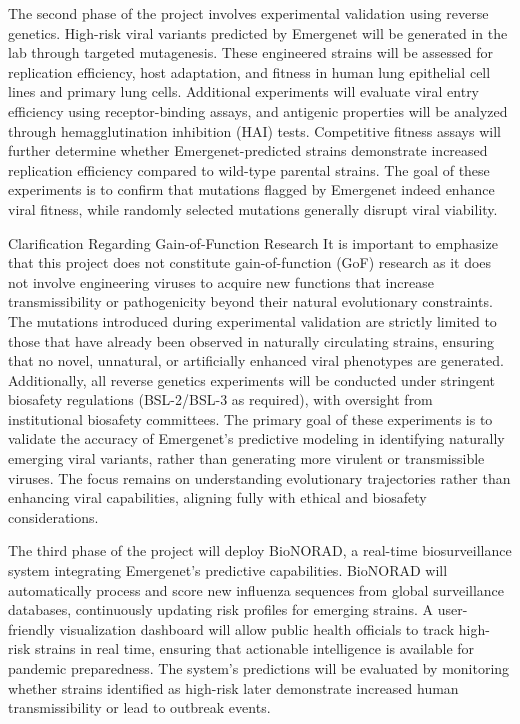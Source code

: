 \documentclass[onecolumn, compsoc,10pt]{IEEEtran}
\begin{document}
The second phase of the project involves experimental validation using reverse genetics. High-risk viral variants predicted by Emergenet will be generated in the lab through targeted mutagenesis. These engineered strains will be assessed for replication efficiency, host adaptation, and fitness in human lung epithelial cell lines and primary lung cells. Additional experiments will evaluate viral entry efficiency using receptor-binding assays, and antigenic properties will be analyzed through hemagglutination inhibition (HAI) tests. Competitive fitness assays will further determine whether Emergenet-predicted strains demonstrate increased replication efficiency compared to wild-type parental strains. The goal of these experiments is to confirm that mutations flagged by Emergenet indeed enhance viral fitness, while randomly selected mutations generally disrupt viral viability.

Clarification Regarding Gain-of-Function Research
It is important to emphasize that this project does not constitute gain-of-function (GoF) research as it does not involve engineering viruses to acquire new functions that increase transmissibility or pathogenicity beyond their natural evolutionary constraints. The mutations introduced during experimental validation are strictly limited to those that have already been observed in naturally circulating strains, ensuring that no novel, unnatural, or artificially enhanced viral phenotypes are generated. Additionally, all reverse genetics experiments will be conducted under stringent biosafety regulations (BSL-2/BSL-3 as required), with oversight from institutional biosafety committees. The primary goal of these experiments is to validate the accuracy of Emergenet’s predictive modeling in identifying naturally emerging viral variants, rather than generating more virulent or transmissible viruses. The focus remains on understanding evolutionary trajectories rather than enhancing viral capabilities, aligning fully with ethical and biosafety considerations.

The third phase of the project will deploy BioNORAD, a real-time biosurveillance system integrating Emergenet’s predictive capabilities. BioNORAD will automatically process and score new influenza sequences from global surveillance databases, continuously updating risk profiles for emerging strains. A user-friendly visualization dashboard will allow public health officials to track high-risk strains in real time, ensuring that actionable intelligence is available for pandemic preparedness. The system’s predictions will be evaluated by monitoring whether strains identified as high-risk later demonstrate increased human transmissibility or lead to outbreak events.
\end{document}
